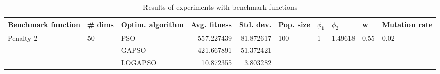 \begin{table}
\centering
\caption{Results of experiments with benchmark functions}
\begin{tabular}{lllrrlllll}
\toprule
        Benchmark function &             \# dims & Optim. algorithm &  Avg. fitness &  Std. dev. &            Pop. size &         $\phi_{1}$ &               $\phi_{2}$ &                     w &         Mutation rate \\
\midrule
\multirow{3}{*}{Penalty 2} & \multirow{3}{*}{50} &              PSO &    557.227439 &  81.872617 & \multirow{3}{*}{100} & \multirow{3}{*}{1} & \multirow{3}{*}{1.49618} & \multirow{3}{*}{0.55} & \multirow{3}{*}{0.02} \\
                           &                     &            GAPSO &    421.667891 &  51.372421 &                      &                    &                          &                       &                       \\
                           &                     &          LOGAPSO &     10.872355 &   3.803282 &                      &                    &                          &                       &                       \\
\bottomrule
\end{tabular}
\end{table}
